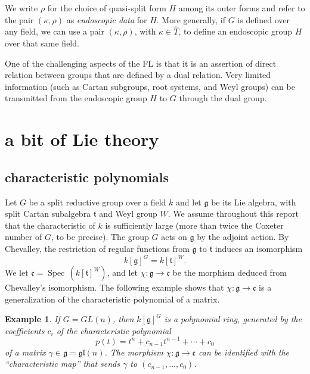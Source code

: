 \documentclass[brochure,english,12pt]{bourbaki}
\theoremstyle{plain}
\newtheorem{example}[equation]{Example}
\def\op#1{{\operatorname{#1}}}
\def\gl{\mathfrak{gl}}
\def\g{\mathfrak{g}}
\def\t{\mathfrak{t}}
\def\cc{\mathfrak{c}}
\begin{document}
We write $\rho$ for the choice of quasi-split form $H$ among its outer
forms and refer to the pair $(\kappa,\rho)$ as {\it endoscopic data}
for $H$.  More generally, if $G$ is defined over any field, we can use
a pair $(\kappa,\rho)$, with $\kappa\in \hat T$, to define
an endoscopic group $H$ over that same field.

One of the challenging aspects of the FL is that it is an assertion of
direct relation between groups that are defined by a dual
relation.  Very limited information (such as
Cartan subgroups, root systems, and Weyl groups) can be transmitted
from the endoscopic group $H$ to $G$ through the dual group.





\section{a bit of Lie theory}



\subsection{characteristic polynomials}\label{sec:chevalley}



Let $G$ be a split reductive group over a field $k$ and let
$\g$ be its Lie algebra, with split Cartan subalgebra $\t$ and Weyl
group $W$.  We assume throughout this report that the characteristic of $k$ is sufficiently
large (more than twice the Coxeter number of $G$, to be precise).  The group
$G$ acts on $\g$ by the adjoint action.  By Chevalley,  the restriction  of regular
functions from $\g$ to $\t$ induces an isomorphism
\[
k[\g]^G = k[\t]^W.
\]
We let $\cc =  \op{Spec}\,(k[\t]^W)$, and let $\chi:\g\to\cc$ be the morphism deduced from
Chevalley's isomorphism.  The following example shows that $\chi:\g\to\cc$ is a generalization
of the characteristic polynomial of a matrix.

\begin{example}
If $G=GL(n)$, then $k[\g]^G$ is a polynomial ring,  generated by the coefficients $c_i$ of the characteristic
polynomial 
\begin{equation}
p(t)=t^n + c_{n-1} t^{n-1} +\cdots +c_0
\end{equation}
of a matrix $\gamma\in \g=\gl(n)$.  The morphism $\chi:\g\to\cc$ can be identified with
the ``characteristic map'' that sends $\gamma$ to $(c_{n-1},\ldots,c_0)$.
\end{example}
\end{document}
